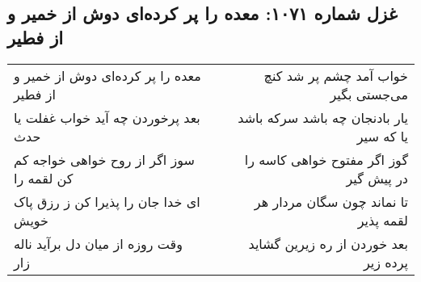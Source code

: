 \begin{center}
\section*{غزل شماره ۱۰۷۱: معده را پر کرده‌ای دوش از خمیر و از فطیر}
\label{sec:1071}
\begin{longtable}{l p{0.5cm} r}
معده را پر کرده‌ای دوش از خمیر و از فطیر
&&
خواب آمد چشم پر شد کنچ می‌جستی بگیر
\\
بعد پرخوردن چه آید خواب غفلت یا حدث
&&
یار بادنجان چه باشد سرکه باشد یا که سیر
\\
سوز اگر از روح خواهی خواجه کم کن لقمه را
&&
گوز اگر مفتوح خواهی کاسه را در پیش گیر
\\
ای خدا جان را پذیرا کن ز رزق پاک خویش
&&
تا نماند چون سگان مردار هر لقمه پذیر
\\
وقت روزه از میان دل برآید ناله زار
&&
بعد خوردن از ره زیرین گشاید پرده زیر
\\
\end{longtable}
\end{center}
